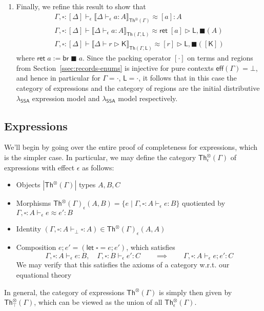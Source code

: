 \documentclass[acmsmall,screen,review]{acmart}
\newcommand{\ms}[1]{\ensuremath{\mathsf{#1}}}
\newcommand{\brb}[2]{\ms{br}\;#1\;#2}
\newcommand{\bhyp}[2]{#1 : #2}
\newcommand{\hasty}[4]{#1 \vdash_{#2} #3: {#4}}
\newcommand{\haslb}[3]{#1 \vdash #2 \rhd #3}
\newcommand{\teqv}{\approx}
\newcommand{\tmeq}[5]{#1 \vdash_{#2} #3 \teqv #4 : {#5}}
\newcommand{\lbeq}[4]{#1 \vdash #2 \teqv #3 \rhd {#4}}
\newcommand{\dnt}[1]{\llbracket{#1}\rrbracket}
\newcommand{\invar}{\square}
\newcommand{\outlb}{\blacksquare}
\newcommand{\isotopessa}{\(\lambda_{\ms{SSA}}\)}
\begin{document}
\begin{enumerate}
  \item Finally, we refine this result to show that
  \begin{equation}
    \begin{gathered}
    \tmeq{\Gamma, \invar : [\Delta]}{\epsilon}
      {\dnt{\hasty{\Delta}{\epsilon}{a}{A}}_{\ms{Th}^\otimes(\Gamma)}}{[a]}{A}
    \\
    \lbeq{\Gamma, \invar : [\Delta]}
      {\dnt{\hasty{\Delta}{\epsilon}{a}{A}}_{\ms{Th}(\Gamma, \ms{L})}}{\ms{ret}\;[a]}{\ms{L}, \outlb(A)}
    \\
    \lbeq{\Gamma, \invar : [\Delta]}
      {\dnt{\haslb{\Delta}{r}{\ms{K}}}_{\ms{Th}(\Gamma, \ms{L})}}{[r]}{\ms{L}, \outlb([\ms{K}])}
    \end{gathered}
  \end{equation}
  where $\ms{ret}\;a := \brb{\outlb}{a}$. Since the packing operator $[\cdot]$ on terms and regions
  from Section~\ref{ssec:records-enums} is injective for pure contexts $\ms{eff}(\Gamma) = \bot$,
  and hence in particular for $\Gamma = \cdot$, $\ms{L} = \cdot$, it follows that in this case the
  category of expressions and the category of regions are the initial distributive \isotopessa{}
  expression model and \isotopessa{} model respectively.
\end{enumerate}

\subsection{Expressions}

We'll begin by going over the entire proof of completeness for expressions, which is the simpler
case. In particular, we may define the category $\ms{Th}_\epsilon^\otimes(\Gamma)$ of expressions
with effect $\epsilon$ as follows:
\begin{itemize}
  \item Objects $|\ms{Th}^\otimes(\Gamma)|$ types $A, B, C$
  \item Morphisms $\ms{Th}^\otimes(\Gamma)_\epsilon(A, B) = \{e \mid \hasty{\Gamma,
    \bhyp{\invar}{A}}{\epsilon}{e}{B}\}$ quotiented by $\tmeq{\Gamma,
    \bhyp{\invar}{A}}{\epsilon}{e}{e'}{B}$
  \item Identity $(\hasty{\Gamma, \bhyp{\invar}{A}}{\bot}{\invar}{A}) \in
  \ms{Th}^\otimes(\Gamma)_\epsilon(A, A)$
  \item Composition $e;e' = (\ms{let}\;\invar = e; e')$, which satisfies
  $$
  \hasty{\Gamma, \bhyp{\invar}{A}}{\epsilon}{e}{B}, \quad
  \hasty{\Gamma, \bhyp{\invar}{B}}{\epsilon}{e'}{C} \qquad \implies \qquad
  \hasty{\Gamma, \bhyp{\invar}{A}}{\epsilon}{e;e'}{C}
  $$
  We may verify that this satisfies the axioms of a category w.r.t. our equational theory
\end{itemize}
In general, the category of expressions $\ms{Th}^\otimes(\Gamma)$ is simply then given by
$\ms{Th}_\top^\otimes(\Gamma)$, which can be viewed as the union of all
$\ms{Th}_\epsilon^\otimes(\Gamma)$.
\end{document}
